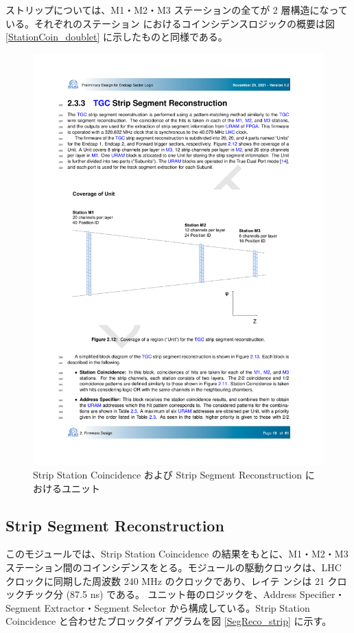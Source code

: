 ストリップについては、M1・M2・M3 ステーションの全てが 2 層構造になっている。それぞれのステーション
におけるコインシデンスロジックの概要は図\ref{StationCoin_doublet} に示したものと同様である。

\begin{figure} 
\centering
\includegraphics[width=16cm]{fig/SL/StationCoin_unit_strip.pdf}
\caption[Strip Station Coincidence および Strip Segment Reconstruction におけるユニット]{Strip Station Coincidence および Strip Segment Reconstruction におけるユニット}
\label{StationCoin_unit_strip}
\end{figure}

\subsection*{Strip Segment Reconstruction}
このモジュールでは、Strip Station Coincidence の結果をもとに、M1・M2・M3 ステーション間のコインシデンスをとる。モジュールの駆動クロックは、LHC クロックに同期した周波数 240 MHz のクロックであり、レイテ ンシは 21 クロックチック分 (87.5 ns) である。
ユニット毎のロジックを、Address Specifier・Segment Extractor・Segment Selector から構成している。Strip Station Coincidence と合わせたブロックダイアグラムを図 \ref{SegReco_strip} に示す。

